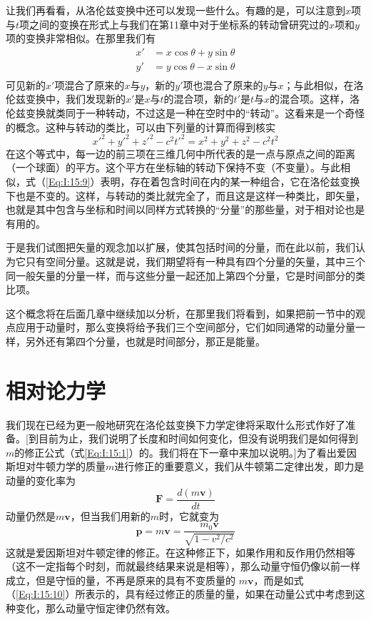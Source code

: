 让我们再看看，从洛伦兹变换中还可以发现一些什么。有趣的是，可以注意到$x$项与$t$项之间的变换在形式上与我们在第11章中对于坐标系的转动曾研究过的$x$项和$y$项的变换非常相似。在那里我们有
\begin{equation}
    \label{Eq:I:15:8}
    \begin{aligned}
        x'&=x\cos\theta + y\sin\theta \\
        y'&=y\cos\theta - x\sin\theta \\
    \end{aligned}
\end{equation}
可见新的$x'$项混合了原来的$x$与$y$，新的$y'$项也混合了原来的$y$与$x$；与此相似，在洛伦兹变换中，我们发现新的$x'$是$x$与$t$的混合项，新的$t'$是$t$与$x$的混合项。这样，洛伦兹变换就类同于一种转动，不过这是一种在空时中的“转动”。这看来是一个奇怪的概念。这种与转动的类比，可以由下列量的计算而得到核实
\begin{equation}
    \label{Eq:I:15:9}
    x'^2 + y'^2 + z'^2 - c^2t'^2 = x^2 + y^2 + z^2 - c^2t^2
\end{equation}
在这个等式中，每一边的前三项在三维几何中所代表的是一点与原点之间的距离（一个球面）的平方。这个平方在坐标轴的转动下保持不变（不变量）。与此相似，式（\ref{Eq:I:15:9}）表明，存在着包含时间在内的某一种组合，它在洛伦兹变换下也是不变的。这样，与转动的类比就完全了，而且这是这样一种类比，即矢量，也就是其中包含与坐标和时间以同样方式转换的“分量”的那些量，对于相对论也是有用的。

于是我们试图把矢量的观念加以扩展，使其包括时间的分量，而在此以前，我们认为它只有空间分量。这就是说，我们期望将有一种具有四个分量的矢量，其中三个同一般矢量的分量一样，而与这些分量一起还加上第四个分量，它是时间部分的类比项。

这个概念将在后面几章中继续加以分析，在那里我们将看到，如果把前一节中的观点应用于动量时，那么变换将给予我们三个空间部分，它们如同通常的动量分量一样，另外还有第四个分量，也就是时间部分，那正是能量。

\section{相对论力学}

我们现在已经为更一般地研究在洛伦兹变换下力学定律将采取什么形式作好了准备。[到目前为止，我们说明了长度和时间如何变化，但没有说明我们是如何得到$m$的修正公式（式\ref{Eq:I:15:1}）的。我们将在下一章中来加以说明。]为了看出爱因斯坦对牛顿力学的质量$m$进行修正的重要意义，我们从牛顿第二定律出发，即力是动量的变化率为
\begin{equation*}
    \boldsymbol{F} = \frac{d(m\boldsymbol{v})}{dt}
\end{equation*}
动量仍然是$m\boldsymbol{v}$，但当我们用新的$m$时，它就变为
\begin{equation}
    \label{Eq:I:15:10}
    \boldsymbol{p} = m\boldsymbol{v} = \frac{m_0\boldsymbol{v}}{\sqrt{1-v^2/c^2}}
\end{equation}
这就是爱因斯坦对牛顿定律的修正。在这种修正下，如果作用和反作用仍然相等（这不一定指每个时刻，而就最终结果来说是相等），那么动量守恒仍像以前一样成立，但是守恒的量，不再是原来的具有不变质量的 $m\boldsymbol{v}$，而是如式（\ref{Eq:I:15:10}）所表示的，具有经过修正的质量的量，如果在动量公式中考虑到这种变化，那么动量守恒定律仍然有效。

